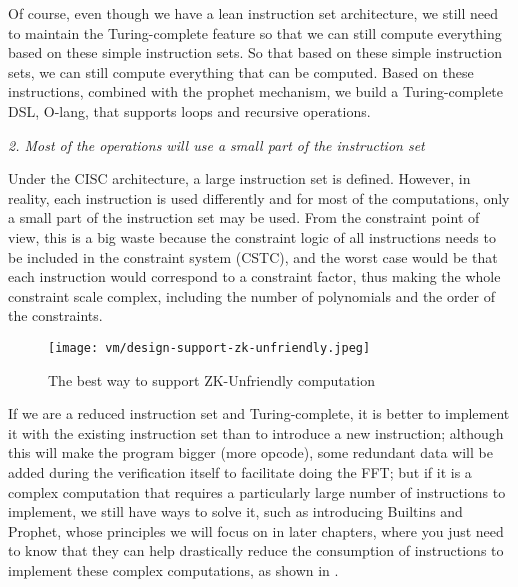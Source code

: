 Of course, even though we have a lean instruction set architecture, we still need to maintain the Turing-complete feature so that
we can still compute everything based on these simple instruction sets. So that based on these simple instruction sets, we can still
compute everything that can be computed. Based on these instructions, combined with the prophet mechanism, we build a Turing-complete
DSL, O-lang, that supports loops and recursive operations.

\emph{2. Most of the operations will use a small part of the instruction set}

Under the CISC architecture, a large instruction set is defined. However, in reality, each instruction is used differently and for most
of the computations, only a small part of the instruction set may be used. From the constraint point of view, this is a big waste because
the constraint logic of all instructions needs to be included in the constraint system (CSTC), and the worst case would be that each instruction
would correspond to a constraint factor, thus making the whole constraint scale complex, including the number of polynomials and the order of
the constraints.

\begin{figure}[!ht]
    \centering
    \texttt{[image: vm/design-support-zk-unfriendly.jpeg]}
    \caption{The best way to support ZK-Unfriendly computation}
    \label{fig:desgin-support-zk-unfriendly}
\end{figure}

If we are a reduced instruction set and Turing-complete, it is better to implement it with the existing instruction set than to introduce a new
instruction; although this will make the program bigger (more opcode), some redundant data will be added during the verification itself to
facilitate doing the FFT; but if it is a complex computation that requires a particularly large number of instructions to implement, we still
have ways to solve it, such as introducing Builtins and Prophet, whose principles we will focus on in later chapters, where you just need to
know that they can help drastically reduce the consumption of instructions to implement these complex computations, as shown in .